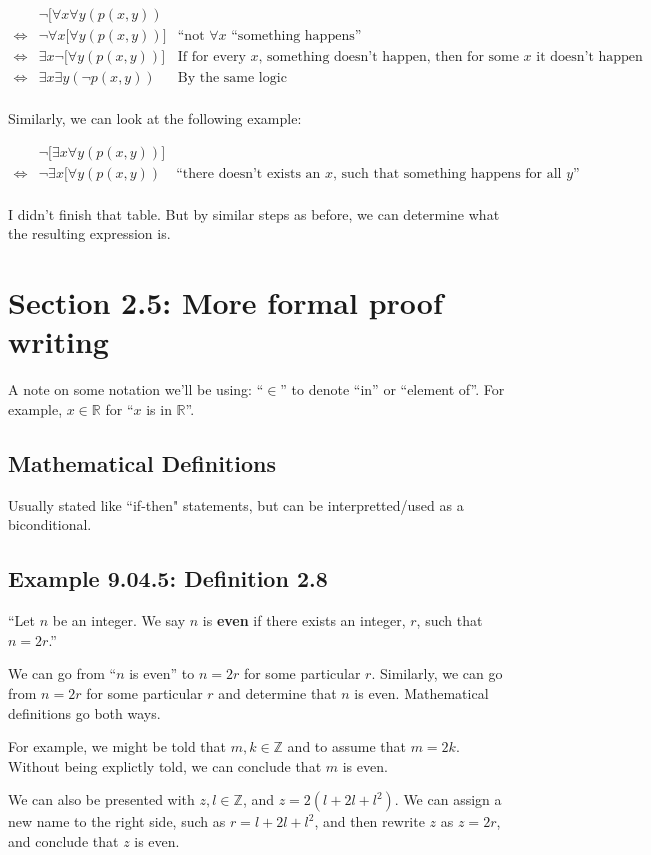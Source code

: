 \documentclass{article}
\begin{document}
\[
\begin{array}{cll}
 & \neg\lbrack\forall{}x\forall{}y(p(x,y)) & \\
\Leftrightarrow & \neg\forall x\lbrack\forall y(p(x,y))\rbrack & \text{``not $\forall{}x$ ``something happens''} \\
\Leftrightarrow & \exists x\neg\lbrack\forall y(p(x,y))\rbrack & \text{If for every $x$, something doesn't happen, then for some $x$ it doesn't happen} \\
\Leftrightarrow & \exists x\exists y (\neg p(x,y)) & \text{By the same logic} \\
\end{array}
\]

Similarly, we can look at the following example:

\[
\begin{array}{cll}
 & \neg\lbrack\exists x\forall y(p(x,y))\rbrack & \\
\Leftrightarrow & \neg\exists x\lbrack\forall y(p(x,y)) & \text{``there doesn't exists an $x$, such that something happens for all $y$''} \\
\end{array}
\]

I didn't finish that table. But by similar steps as before, we can
determine what the resulting expression is.

\section*{Section 2.5: More formal proof writing}

A note on some notation we'll be using: ``$\in$'' to denote ``in'' or
``element of''. For example, $x\in\mathbb{R}$ for ``$x$ is in
$\mathbb{R}$''.

\subsection*{Mathematical Definitions}

Usually stated like ``if-then" statements, but can be
interpretted/used as a biconditional.

\subsection*{Example 9.04.5: Definition 2.8}

``Let $n$ be an integer. We say $n$ is \textbf{even} if there exists
an integer, $r$, such that $n=2r$.''

We can go from ``$n$ is even'' to $n=2r$ for some particular
$r$. Similarly, we can go from $n=2r$ for some particular $r$ and
determine that $n$ is even. Mathematical definitions go both ways.

For example, we might be told that $m,k\in\mathbb{Z}$ and to assume
that $m=2k$. Without being explictly told, we can conclude that $m$ is
even.

We can also be presented with $z,l\in\mathbb{Z}$, and
$z=2(l+2l+l^2)$. We can assign a new name to the right side, such as
$r=l+2l+l^2$, and then rewrite $z$ as $z=2r$, and conclude that $z$ is
even.
\end{document}
